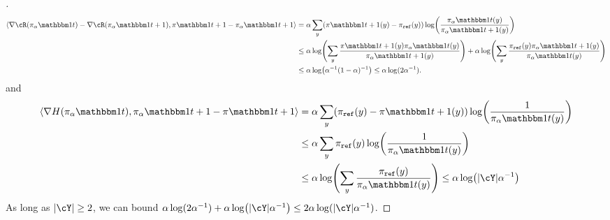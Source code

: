 \documentclass{article}
\begin{document}
\begin{proof}[]
\begin{align*}
  \tri*{\grad\cR(\pia\ind{t})-\grad\cR(\pia\ind{t+1}),\pi\ind{t+1}-\pia\ind{t+1}}
  &=
    \alpha\sum_{y}(\pi\ind{t+1}(y)-\piref(y))\log\prn*{\frac{\pia\ind{t}(y)}{\pia\ind{t+1}(y)}}\\
  &\leq
    \alpha\log\prn*{\sum_{y}\frac{\pi\ind{t+1}(y)\pia\ind{t}(y)}{\pia\ind{t+1}(y)}}
    +
    \alpha\log\prn*{\sum_y\frac{\piref(y)\pia\ind{t+1}(y)}{\pia\ind{t}(y)}}\\
    &\leq
      \alpha\log\prn*{\alpha^{-1}(1-\alpha)^{-1}}
      \leq{}\alpha\log(2\alpha^{-1}).
\end{align*}
and
\begin{align*}
  \tri*{\grad{}H(\pia\ind{t}),\pia\ind{t+1}-\pi\ind{t+1}}
  &=
    \alpha\sum_{y}(\piref(y)-\pi\ind{t+1}(y))\log\prn*{\frac{1}{\pia\ind{t}(y)}}\\
  &\leq \alpha\sum_{y}\piref(y)\log\prn*{\frac{1}{\pia\ind{t}(y)}}\\
  &\leq \alpha\log\prn*{\sum_{y}\frac{\piref(y)}{\pia\ind{t}(y)}}
    \leq{}\alpha\log\prn*{\abs{\cY}\alpha^{-1}}
\end{align*}
As long as $\abs{\cY}\geq{}2$, we can bound
$\alpha\log(2\alpha^{-1})+\alpha\log\prn*{\abs{\cY}\alpha^{-1}}
\leq{}2\alpha\log(\abs{\cY}\alpha^{-1})$.
\end{proof}
\end{document}
